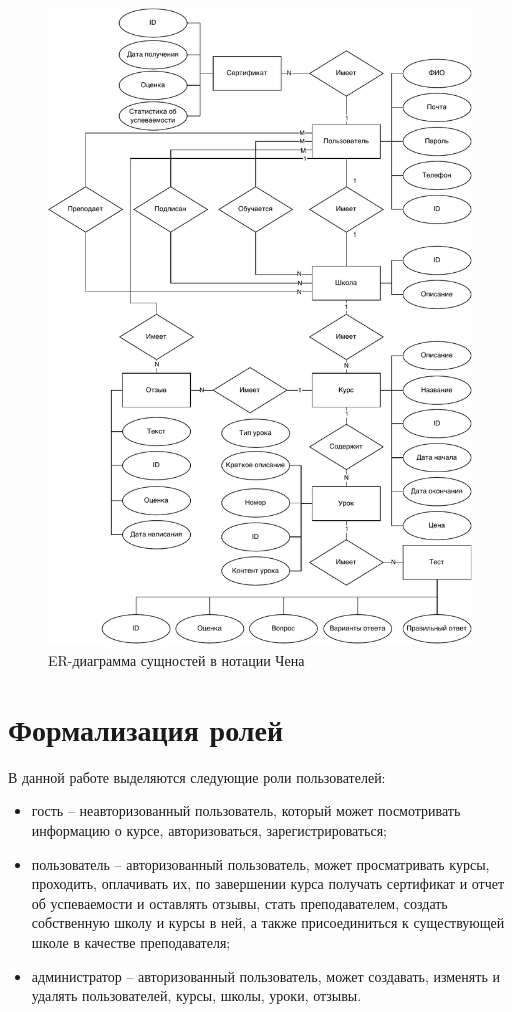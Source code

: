 \begin{figure}[H]
	\centering
	\includegraphics[height=0.9\textheight]{inc/img/er.pdf}
	\caption{ER-диаграмма сущностей в нотации Чена}
	\label{img:er}
\end{figure}

\section{Формализация ролей}
В данной работе выделяются следующие роли пользователей:
\begin{itemize}
    \item гость -- неавторизованный пользователь, который может посмотривать информацию о курсе,
    авторизоваться, зарегистрироваться;
    \item пользователь -- авторизованный пользователь, может просматривать курсы, проходить, оплачивать их,
    по завершении курса получать сертификат и отчет об успеваемости и оставлять отзывы,
    стать преподавателем, создать собственную школу и курсы в ней,
    а также присоединиться к существующей школе в качестве преподавателя;
    \item администратор -- авторизованный пользователь, может создавать, изменять и удалять пользователей, курсы, школы, уроки, отзывы.
\end{itemize}

